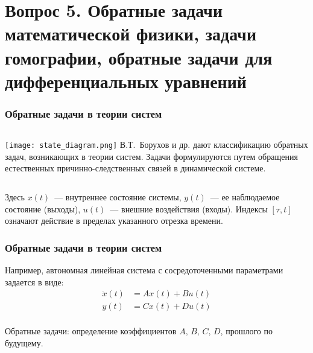 \documentclass[compress]{beamer}
\begin{document}
    \section[Вопрос 5]{Вопрос 5. Обратные задачи математической физики, задачи гомографии, обратные задачи для дифференциальных уравнений}

    \begin{frame}\frametitle{Обратные задачи в теории систем}

        \begin{columns}
                \centering
                \texttt{[image: state\_diagram.png]}
                В.Т.~Борухов и др. \cite{BGT09} дают классификацию обратных задач, возникающих в теории систем. Задачи формулируются путем обращения естественных причинно-следственных связей в динамической системе.
        \end{columns}

        \vspace*{\fill}

        Здесь $x(t)$~--- внутреннее состояние системы, $y(t)$~--- ее наблюдаемое состояние (выходы), $u(t)$~--- внешние воздействия (входы). Индексы $[\tau,t]$ означают действие в пределах указанного отрезка времени.

    \end{frame}

    \begin{frame}\frametitle{Обратные задачи в теории систем}

        Например, автономная линейная система с сосредоточенными параметрами задается в виде:
        \begin{align*}
            \dot{x}(t) &= A x(t) + B u(t) \\
            y(t)       &= C x(t) + D u(t) \\
        \end{align*}

        Обратные задачи: определение коэффициентов $A,\,B,\,C,\,D$, прошлого по будущему.

    \end{frame}
\end{document}
